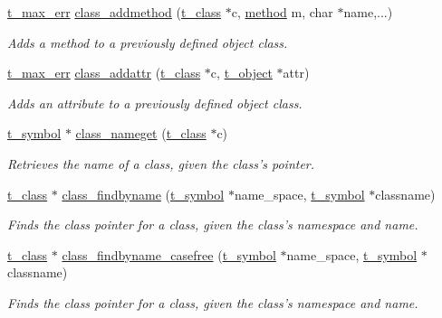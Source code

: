 \begin{DoxyCompactItemize}
\hyperlink{group__datatypes_ga73edaae82b318855cc09fac994918165}{t\_\-max\_\-err} \hyperlink{group__class_ga1fabf54e0cec8d4e5f732fa347b3f874}{class\_\-addmethod} (\hyperlink{structt__class}{t\_\-class} $\ast$c, \hyperlink{group__datatypes_gac26ba0a173b50597f5738132e059b42d}{method} m, char $\ast$name,...)
\begin{DoxyCompactList}\small\item\em Adds a method to a previously defined object class. \item\end{DoxyCompactList}\item 
\hyperlink{group__datatypes_ga73edaae82b318855cc09fac994918165}{t\_\-max\_\-err} \hyperlink{group__class_ga2289eb7e26b552be6e015c2f9912a9ac}{class\_\-addattr} (\hyperlink{structt__class}{t\_\-class} $\ast$c, \hyperlink{structt__object}{t\_\-object} $\ast$attr)
\begin{DoxyCompactList}\small\item\em Adds an attribute to a previously defined object class. \item\end{DoxyCompactList}\item 
\hyperlink{structt__symbol}{t\_\-symbol} $\ast$ \hyperlink{group__class_ga32dab29dac27195676d8edfed8e04798}{class\_\-nameget} (\hyperlink{structt__class}{t\_\-class} $\ast$c)
\begin{DoxyCompactList}\small\item\em Retrieves the name of a class, given the class's pointer. \item\end{DoxyCompactList}\item 
\hyperlink{structt__class}{t\_\-class} $\ast$ \hyperlink{group__class_ga11d93886daa53a3e0dea974176190301}{class\_\-findbyname} (\hyperlink{structt__symbol}{t\_\-symbol} $\ast$name\_\-space, \hyperlink{structt__symbol}{t\_\-symbol} $\ast$classname)
\begin{DoxyCompactList}\small\item\em Finds the class pointer for a class, given the class's namespace and name. \item\end{DoxyCompactList}\item 
\hyperlink{structt__class}{t\_\-class} $\ast$ \hyperlink{group__class_gacfffc94c91ff5254f8acc363be75b577}{class\_\-findbyname\_\-casefree} (\hyperlink{structt__symbol}{t\_\-symbol} $\ast$name\_\-space, \hyperlink{structt__symbol}{t\_\-symbol} $\ast$classname)
\begin{DoxyCompactList}\small\item\em Finds the class pointer for a class, given the class's namespace and name. \item\end{DoxyCompactList}\item 

\end{DoxyCompactItemize}
